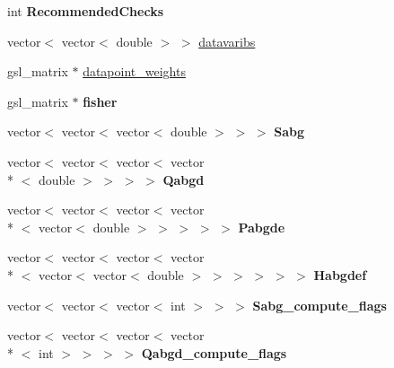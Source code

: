 \begin{DoxyCompactItemize}
\item 
\hypertarget{classDaliBase_aa73ef6f87c8e93d48c64611753eeb936}{int {\bfseries Recommended\-Checks}}\label{classDaliBase_aa73ef6f87c8e93d48c64611753eeb936}

\item 
vector$<$ vector$<$ double $>$ $>$ \hyperlink{classDaliBase_abe548366dfd28590f8db1f681bb1b77d}{datavaribs}
\item 
gsl\-\_\-matrix $\ast$ \hyperlink{classDaliBase_ac287ff97afe28a93bda558357beaee0d}{datapoint\-\_\-weights}
\item 
\hypertarget{classDaliBase_acc9bb2f0566d88a5876675ed3851b0b1}{gsl\-\_\-matrix $\ast$ {\bfseries fisher}}\label{classDaliBase_acc9bb2f0566d88a5876675ed3851b0b1}

\item 
\hypertarget{classDaliBase_a0afc645ad45078e4c3497fe71549a7d9}{vector$<$ vector$<$ vector$<$ double $>$ $>$ $>$ {\bfseries Sabg}}\label{classDaliBase_a0afc645ad45078e4c3497fe71549a7d9}

\item 
\hypertarget{classDaliBase_a431a69681b94c3e25c27726a4aad26e3}{vector$<$ vector$<$ vector$<$ vector\\*
$<$ double $>$ $>$ $>$ $>$ {\bfseries Qabgd}}\label{classDaliBase_a431a69681b94c3e25c27726a4aad26e3}

\item 
\hypertarget{classDaliBase_a0d897fa7e8288582f858ea60f10fae0b}{vector$<$ vector$<$ vector$<$ vector\\*
$<$ vector$<$ double $>$ $>$ $>$ $>$ $>$ {\bfseries Pabgde}}\label{classDaliBase_a0d897fa7e8288582f858ea60f10fae0b}

\item 
\hypertarget{classDaliBase_a2bc46d476c8f956d3c5484a6084e4ee3}{vector$<$ vector$<$ vector$<$ vector\\*
$<$ vector$<$ vector$<$ double $>$ $>$ $>$ $>$ $>$ $>$ {\bfseries Habgdef}}\label{classDaliBase_a2bc46d476c8f956d3c5484a6084e4ee3}

\item 
\hypertarget{classDaliBase_a996d0fec050aec51231beca9c6382875}{vector$<$ vector$<$ vector$<$ int $>$ $>$ $>$ {\bfseries Sabg\-\_\-compute\-\_\-flags}}\label{classDaliBase_a996d0fec050aec51231beca9c6382875}

\item 
\hypertarget{classDaliBase_ae81009c7aa5c2114435908af78cff212}{vector$<$ vector$<$ vector$<$ vector\\*
$<$ int $>$ $>$ $>$ $>$ {\bfseries Qabgd\-\_\-compute\-\_\-flags}}\label{classDaliBase_ae81009c7aa5c2114435908af78cff212}


\end{DoxyCompactItemize}

